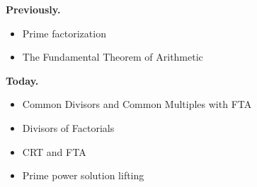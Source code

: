\documentclass[t]{beamer}
\subtitle{Applications of the Fundamental Theorem of Arithmetic}
\begin{document}
	
\startdoc
\begin{frame}[c]{\insertframenumber}
	\begin{block}{\textbf{Previously.}}
	\begin{itemize}[label=--]
        \item Prime factorization
        \item The Fundamental Theorem of Arithmetic
	\end{itemize}
	\end{block}
	\begin{block}{\textbf{Today.}}
		\begin{itemize}[label=--]
            \item Common Divisors and Common Multiples with FTA 
            \item Divisors of Factorials
            \item CRT and FTA 
            \item Prime power solution lifting
		\end{itemize}
	\end{block}
\end{frame}
\end{document}
